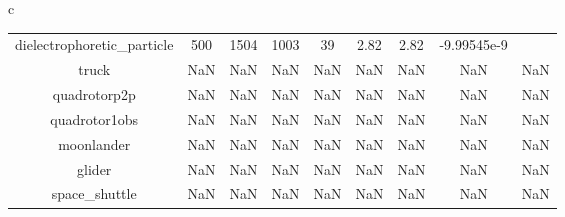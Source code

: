 \documentclass{standalone}
\begin{document}
\begin{tabular}{c}
\begin{tabular}{ccccccccc}
  dielectrophoretic\_particle & 500 & 1504 & 1003 & 39 & 2.82 & 2.82 & -9.99545e-9 & \color{red}{Infeasible Problem} \\
  truck & NaN & NaN & NaN & NaN & NaN & NaN & NaN & NaN \\
  quadrotorp2p & NaN & NaN & NaN & NaN & NaN & NaN & NaN & NaN \\
  quadrotor1obs & NaN & NaN & NaN & NaN & NaN & NaN & NaN & NaN \\
  moonlander & NaN & NaN & NaN & NaN & NaN & NaN & NaN & NaN \\
  glider & NaN & NaN & NaN & NaN & NaN & NaN & NaN & NaN \\
  space\_shuttle & NaN & NaN & NaN & NaN & NaN & NaN & NaN & NaN \\\hline
\end{tabular}
\end{tabular}
\end{document}
